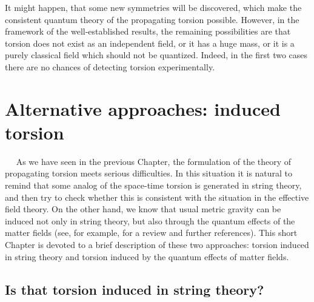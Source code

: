 It might happen, that some new symmetries will be discovered, which 
make the consistent quantum theory of the propagating torsion 
possible. However, in the framework of the well-established 
results, the remaining possibilities are that torsion does not
exist as an independent field, or it has a huge mass, or it is 
a purely classical field which should not be quantized. Indeed,
in the first two cases there are no chances of detecting torsion
experimentally. 

\vskip 10mm
\chapter{Alternative approaches: induced torsion}

$\,\,\,\,\,\,$
As we have seen in the previous Chapter, the formulation of the
theory of propagating torsion meets serious difficulties. 
In this situation it is natural to remind that some analog of 
the space-time torsion is generated in string theory, and then 
try to check whether this is consistent with the situation 
in the effective field theory. 
On the other hand, we know that usual metric gravity can be 
induced not only in string theory, but also through the quantum 
effects of the matter fields (see, for example, \cite{adler}
for a review and further references). This 
short Chapter is devoted to a brief description of these two 
approaches: torsion induced in string theory and torsion induced 
by the quantum effects of matter fields. 

\section{Is that torsion induced in string theory?}

